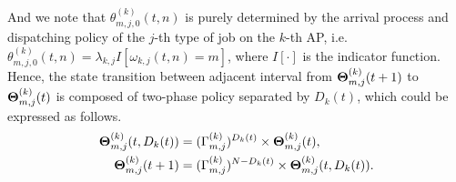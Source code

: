 And we note that $\theta^{(k)}_{m,j,0}(t,n)$ is purely determined by the arrival process and dispatching policy of the $j$-th type of job on the $k$-th AP, i.e. $\theta^{(k)}_{m,j,0}(t,n) = \lambda_{k,j} I[\omega_{k,j}(t,n) = m]$, where $I[\cdot]$ is the indicator function.
Hence, the state transition between adjacent interval from $\boldsymbol{\Theta}^{(k)}_{m,j}(t+1)$ to $\boldsymbol{\Theta}^{(k)}_{m,j}(t)$ is composed of two-phase policy separated by $D_k(t)$, which could be expressed as follows.
\begin{align}
    \boldsymbol{\Theta}^{(k)}_{m,j}(t, D_{k}(t)) &= (\Gamma^{(k)}_{m,j})^{D_{k}(t)} \times \boldsymbol{\Theta}^{(k)}_{m,j}(t),
    \nonumber\\
    \boldsymbol{\Theta}^{(k)}_{m,j}({t+1}) &= (\Gamma^{(k)}_{m,j})^{N-D_{k}(t)} \times \boldsymbol{\Theta}^{(k)}_{m,j}(t, D_{k}(t)).
\end{align}

